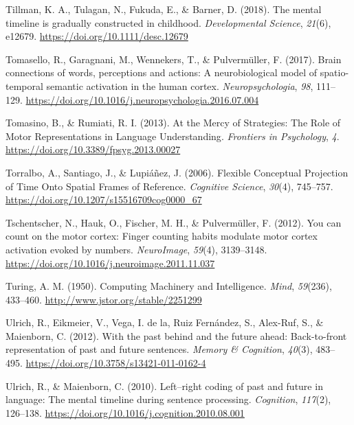 \documentclass[
  a4paper,12pt,twoside,onecolumn,openright,final,oldfontcommands]{memoir}
\newlength{\cslhangindent}
\newlength{\cslentryspacingunit} %
\newenvironment{CSLReferences}[2] %
 {%
  \setlength{\parindent}{0pt}
  \ifodd #1
  \let\oldpar\par
  \def\par{\hangindent=\cslhangindent\oldpar}
  \fi
  \setlength{\parskip}{#2\cslentryspacingunit}
 }%
 {}
\begin{document}
\begin{CSLReferences}{1}{0}
\leavevmode{}%
Tillman, K. A., Tulagan, N., Fukuda, E., \& Barner, D. (2018). The mental timeline is gradually constructed in childhood. \emph{Developmental Science}, \emph{21}(6), e12679. \url{https://doi.org/10.1111/desc.12679}

\leavevmode{}%
Tomasello, R., Garagnani, M., Wennekers, T., \& Pulvermüller, F. (2017). Brain connections of words, perceptions and actions: {A} neurobiological model of spatio-temporal semantic activation in the human cortex. \emph{Neuropsychologia}, \emph{98}, 111--129. \url{https://doi.org/10.1016/j.neuropsychologia.2016.07.004}

\leavevmode{}%
Tomasino, B., \& Rumiati, R. I. (2013). At the {Mercy} of {Strategies}: {The} {Role} of {Motor} {Representations} in {Language} {Understanding}. \emph{Frontiers in Psychology}, \emph{4}. \url{https://doi.org/10.3389/fpsyg.2013.00027}

\leavevmode{}%
Torralbo, A., Santiago, J., \& Lupiáñez, J. (2006). Flexible {Conceptual} {Projection} of {Time} {Onto} {Spatial} {Frames} of {Reference}. \emph{Cognitive Science}, \emph{30}(4), 745--757. \url{https://doi.org/10.1207/s15516709cog0000_67}

\leavevmode{}%
Tschentscher, N., Hauk, O., Fischer, M. H., \& Pulvermüller, F. (2012). You can count on the motor cortex: {Finger} counting habits modulate motor cortex activation evoked by numbers. \emph{NeuroImage}, \emph{59}(4), 3139--3148. \url{https://doi.org/10.1016/j.neuroimage.2011.11.037}

\leavevmode{}%
Turing, A. M. (1950). Computing {Machinery} and {Intelligence}. \emph{Mind}, \emph{59}(236), 433--460. \url{http://www.jstor.org/stable/2251299}

\leavevmode{}%
Ulrich, R., Eikmeier, V., Vega, I. de la, Ruiz Fernández, S., Alex-Ruf, S., \& Maienborn, C. (2012). With the past behind and the future ahead: {Back}-to-front representation of past and future sentences. \emph{Memory \& Cognition}, \emph{40}(3), 483--495. \url{https://doi.org/10.3758/s13421-011-0162-4}

\leavevmode{}%
Ulrich, R., \& Maienborn, C. (2010). Left--right coding of past and future in language: {The} mental timeline during sentence processing. \emph{Cognition}, \emph{117}(2), 126--138. \url{https://doi.org/10.1016/j.cognition.2010.08.001}


\end{CSLReferences}
\end{document}
